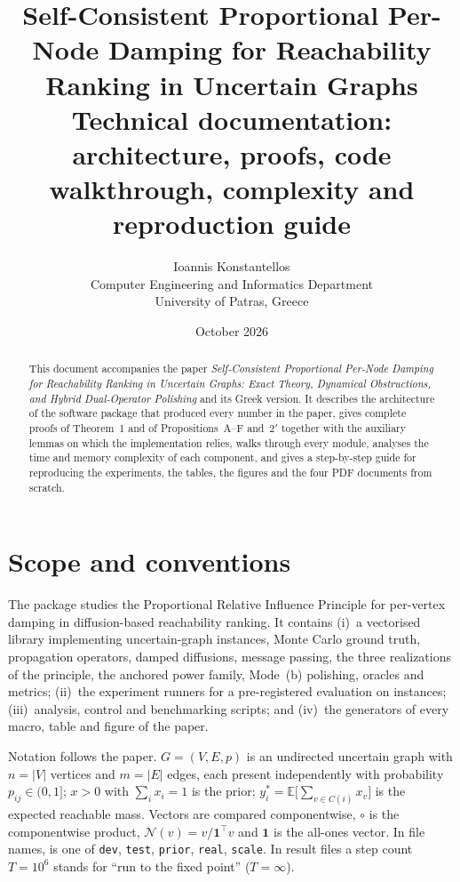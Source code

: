 \documentclass[11pt,a4paper]{article}
\title{\textbf{Self-Consistent Proportional Per-Node Damping for Reachability Ranking in Uncertain Graphs}\\[4pt]
\large Technical documentation: architecture, proofs, code walkthrough, complexity and reproduction guide}
\author{Ioannis Konstantellos\\[2pt]
\small Computer Engineering and Informatics Department\\
\small University of Patras, Greece}
\date{October 2026}
\theoremstyle{definition}
\theoremstyle{plain}
\newcommand{\E}{\mathbb{E}}
\newcommand{\N}{\mathcal{N}}
\newcommand{\one}{\mathbf{1}}
\newcommand{\file}[1]{\path{#1}}
\begin{document}
\maketitle

\begin{abstract}
\noindent This document accompanies the paper \emph{Self-Consistent Proportional Per-Node Damping for Reachability Ranking in Uncertain Graphs: Exact Theory, Dynamical Obstructions, and Hybrid Dual-Operator Polishing} and its Greek version. It describes the architecture of the software package that produced every number in the paper, gives complete proofs of Theorem~1 and of Propositions~A--F and~$2'$ together with the auxiliary lemmas on which the implementation relies, walks through every module, analyses the time and memory complexity of each component, and gives a step-by-step guide for reproducing the experiments, the tables, the figures and the four PDF documents from scratch.
\end{abstract}

\tableofcontents

\section{Scope and conventions}\label{sec:scope}

The package studies the Proportional Relative Influence Principle for per-vertex damping in diffusion-based reachability ranking. It contains (i)~a vectorised library implementing uncertain-graph instances, Monte Carlo ground truth, propagation operators, damped diffusions, message passing, the three realizations of the principle, the anchored power family, Mode~(b) polishing, oracles and metrics; (ii)~the experiment runners for a pre-registered evaluation on \NTotal{} instances; (iii)~analysis, control and benchmarking scripts; and (iv)~the generators of every macro, table and figure of the paper.

Notation follows the paper. $G=(V,E,p)$ is an undirected uncertain graph with $n=|V|$ vertices and $m=|E|$ edges, each present independently with probability $p_{ij}\in(0,1]$; $x>0$ with $\sum_ix_i=1$ is the prior; $y^*_i=\E\big[\sum_{v\in C(i)}x_v\big]$ is the expected reachable mass. Vectors are compared componentwise, $\circ$ is the componentwise product, $\N(v)=v/\one^{\top}v$ and $\one$ is the all-ones vector. In file names, \file{<panel>} is one of \texttt{dev}, \texttt{test}, \texttt{prior}, \texttt{real}, \texttt{scale}. In result files a step count $T=10^6$ stands for ``run to the fixed point'' ($T=\infty$).
\end{document}
